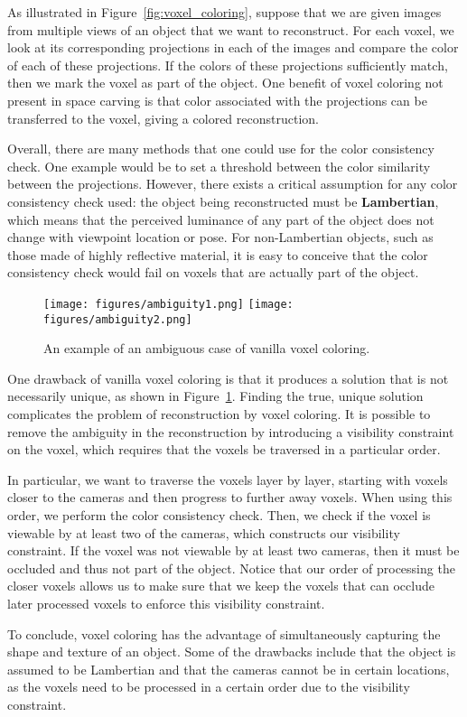 \documentclass[a4paper, 12pt]{article}
\renewcommand\emph{\textbf}
\numberwithin{equation}{section}
\begin{document}
As illustrated in Figure~\ref{fig:voxel_coloring}, suppose that we are given images from multiple views of an object that we want to reconstruct. For each voxel, we look at its corresponding projections in each of the images and compare the color of each of these projections. If the colors of these projections sufficiently match, then we mark the voxel as part of the object. One benefit of voxel coloring not present in space carving is that color associated with the projections can be transferred to the voxel, giving a colored reconstruction.

Overall, there are many methods that one could use for the color consistency check. One example would be to set a threshold between the color similarity between the projections. However, there exists a critical assumption for any color consistency check used: the object being reconstructed must be \emph{Lambertian}, which means that the perceived luminance of any part of the object does not change with viewpoint location or pose. For non-Lambertian objects, such as those made of highly reflective material, it is easy to conceive that the color consistency check would fail on voxels that are actually part of the object.

\begin{figure}[h!]
    \centering
    \texttt{[image: figures/ambiguity1.png]}
    \texttt{[image: figures/ambiguity2.png]}
    \caption{An example of an ambiguous case of vanilla voxel coloring.}
    \label{fig:ambiguity}
\end{figure}

One drawback of vanilla voxel coloring is that it produces a solution that is not necessarily unique, as shown in Figure~\ref{fig:ambiguity}. Finding the true, unique solution complicates the problem of reconstruction by voxel coloring. It is possible to remove the ambiguity in the reconstruction by introducing a visibility constraint on the voxel, which requires that the voxels be traversed in a particular order. 

In particular, we want to traverse the voxels layer by layer, starting with voxels closer to the cameras and then progress to further away voxels. When using this order, we perform the color consistency check. Then, we check if the voxel is viewable by at least two of the cameras, which constructs our visibility constraint. If the voxel was not viewable by at least two cameras, then it must be occluded and thus not part of the object. Notice that our order of processing the closer voxels allows us to make sure that we keep the voxels that can occlude later processed voxels to enforce this visibility constraint. 

To conclude, voxel coloring has the advantage of simultaneously capturing the shape and texture of an object. Some of the drawbacks include that the object is assumed to be Lambertian and that the cameras cannot be in certain locations, as the voxels need to be processed in a certain order due to the visibility constraint.
\end{document}
